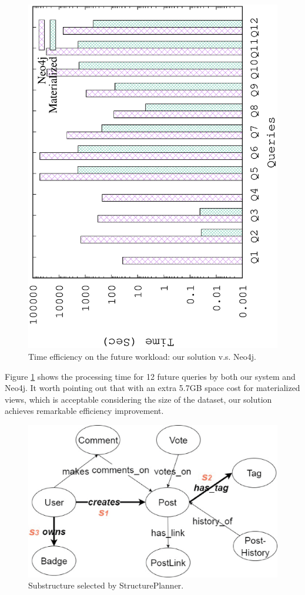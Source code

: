 \begin{figure}[H]
	\centering
	\includegraphics[scale=0.5, angle=270]{plot/neo4j.eps}
	\caption{Time efficiency on the future workload: our solution v.s. Neo4j.}
	\label{fig:neo4j}
\end{figure}

Figure \ref{fig:neo4j} shows the processing time for 12 future queries by both our system and Neo4j. It worth pointing out that with an extra 5.7GB space cost for materialized views, which is acceptable considering the size of the dataset, our solution achieves remarkable efficiency improvement.

\begin{figure}[H]
	\centering
	\includegraphics[scale=0.5]{"pic/MetaSExp.eps"}
	\caption{Substructure selected by StructurePlanner.}
	\label{fig:metagraphexperimenthot}
\end{figure}

